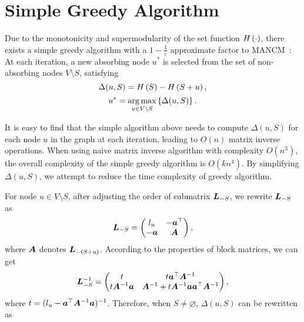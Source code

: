 \documentclass[sigconf]{acmart}
\begin{document}
\section{Simple Greedy Algorithm}\label{sec:simple-greedy}

Due to the monotonicity and supermodularity of the set function \(H\left(\cdot\right)\), there exists a simple greedy algorithm with a \(1-\frac1e\) approximate factor to MANCM~\cite{NeWoFi78}:
At each iteration, a new absorbing node \(u^*\) is selected from the set of non-absorbing nodes \(V\setminus S\), satisfying
\[\Delta(u,S)=H\left(S\right)-H\left(S+u\right),\]
\[u^*=\operatorname*{arg\,max}_{u\in V\setminus S}\left\{\Delta(u,S) \right\}.\]

It is easy to find that the simple algorithm above needs to compute \(\Delta(u,S)\) for each node \(u\) in the graph at each iteration, leading to \(O(n)\) matrix inverse operations.
When using naive matrix inverse algorithm with complexity \(O(n^3)\), the overall complexity of the simple greedy algorithm is \(O(kn^4)\).
By simplifying \(\Delta(u,S)\), we attempt to reduce the time complexity of greedy algorithm.

For node \(u\in V\setminus S\), after adjusting the order of submatrix \(\boldsymbol{L}_{-S}\), we rewrite \(\boldsymbol{L}_{-S}\) as
\[\boldsymbol{L}_{-S}=\begin{pmatrix}l_u & -\boldsymbol{a}^\top \\-\boldsymbol{a}&\boldsymbol{A}\end{pmatrix},\]
where \(\boldsymbol{A}\) denotes \(\boldsymbol{L}_{-(S+u)}\).
According to the properties of block matrices, we can get
\[\boldsymbol{L}_{-S}^{-1}=\begin{pmatrix}
    t & t\boldsymbol{a}^\top\boldsymbol{A}^{-1} \\t\boldsymbol{A}^{-1}\boldsymbol{a}&\boldsymbol{A}^{-1}+t\boldsymbol{A}^{-1}\boldsymbol{a}\boldsymbol{a}^\top\boldsymbol{A}^{-1}
  \end{pmatrix},\]
where \(t=(l_u-\boldsymbol{a}^\top\boldsymbol{A}^{-1}\boldsymbol{a})^{-1}\).
Therefore, when \(S\neq\varnothing\), \(\Delta(u,S)\) can be rewritten as
\end{document}
